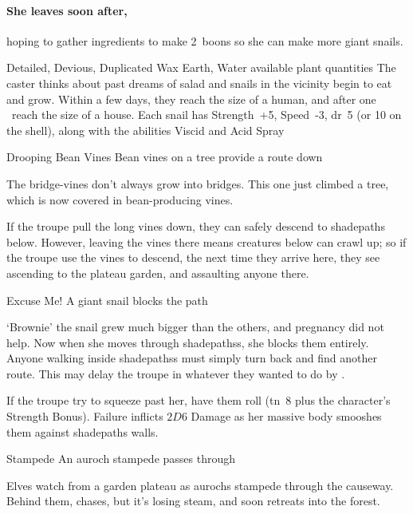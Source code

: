 \paragraph{She leaves soon after,}
hoping to gather \glspl{ingredient} to make 2~\glspl{boon} so she can make more giant snails.

  {Detailed, Devious, Duplicated}%
  {Wax}%
  {Earth, Water}%
  {available plant quantities}%
  {The caster thinks about past dreams of salad and  snails in the vicinity begin to eat and grow.
  Within a few days, they reach the size of a human, and after one \showOnset\ reach the size of a house.
  Each snail has Strength~+5, Speed~-3, \gls{dr}~5 (or 10 on the shell), along with the abilities Viscid and Acid Spray}%
  {}

{Drooping Bean Vines}%
{Bean vines on a tree provide a route down}%

The bridge-vines don't always grow into bridges.
This one just climbed a tree, which is now covered in bean-producing vines.

If the troupe pull the long vines down, they can safely descend to \gls{shadepaths} below.
However, leaving the vines there means creatures below can crawl up; so if the troupe use the vines to descend, the next time they arrive here, they see  ascending to the plateau garden, and assaulting anyone there.


{Excuse Me!}%
{A giant snail blocks the path}%

`Brownie' the snail grew much bigger than the others, and pregnancy did not help.
Now when she moves through \glspl{shadepaths}, she blocks them entirely.
Anyone walking inside \glspl{shadepaths} must simply turn back and find another route.
This may delay the troupe in whatever they wanted to do by .

If the troupe try to squeeze past her, have them roll  (\gls{tn}~8 plus the character's Strength Bonus).
Failure inflicts $2D6$ Damage as her massive body smooshes them against \gls{shadepaths} walls.

{Stampede}%
{An auroch stampede passes through}%

Elves watch from a garden plateau as aurochs stampede through the causeway.
Behind them,  chases, but it's losing steam, and soon retreats into the forest.

